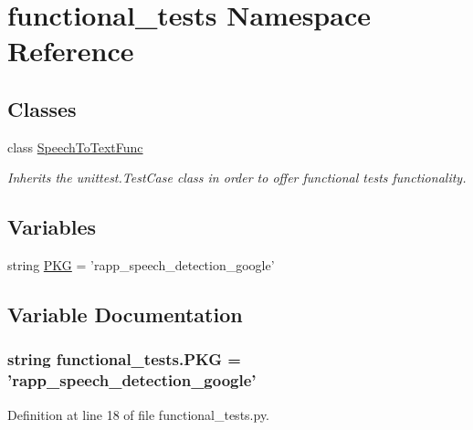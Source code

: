\hypertarget{namespacefunctional__tests}{\section{functional\-\_\-tests Namespace Reference}
\label{namespacefunctional__tests}
}
\subsection*{Classes}
\begin{DoxyCompactItemize}
\item 
class \hyperlink{classfunctional__tests_1_1SpeechToTextFunc}{Speech\-To\-Text\-Func}
\begin{DoxyCompactList}\small\item\em Inherits the unittest.\-Test\-Case class in order to offer functional tests functionality. \end{DoxyCompactList}\end{DoxyCompactItemize}
\subsection*{Variables}
\begin{DoxyCompactItemize}
\item 
string \hyperlink{namespacefunctional__tests_a78507f367d6307db1c1633379cbccc35}{P\-K\-G} = 'rapp\-\_\-speech\-\_\-detection\-\_\-google'
\end{DoxyCompactItemize}


\subsection{Variable Documentation}
\hypertarget{namespacefunctional__tests_a78507f367d6307db1c1633379cbccc35}{
\subsubsection[{P\-K\-G}]{\setlength{\rightskip}{0pt plus 5cm}string functional\-\_\-tests.\-P\-K\-G = 'rapp\-\_\-speech\-\_\-detection\-\_\-google'}}\label{namespacefunctional__tests_a78507f367d6307db1c1633379cbccc35}


Definition at line 18 of file functional\-\_\-tests.\-py.

